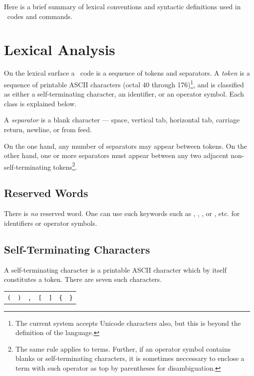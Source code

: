 \documentclass[a4paper]{memoir}
\begin{document}
Here is a brief summary of lexical conventions and syntactic definitions
used in \cafeobj~codes and commands.

\section{Lexical Analysis} \label{sec:lex}

On the lexical surface a \cafeobj~code is a sequence of tokens and
separators.
A {\em token} is a sequence of printable ASCII characters (octal
40 through 176)\footnote{The current system accepts Unicode 
characters also, but this is beyond the definition of
the language.}, and is classified as either a self-terminating
character, an identifier, or an operator symbol. Each class
is explained below.

A {\em separator} is a blank character --- space, vertical tab,
horizontal tab, carriage return, newline, or from feed.

On the one hand, any mumber of separators may appear between tokens. 
On the other hand, one or more separators must appear between any two
adjacent non-self-terminating tokens\footnote{The same rule
applies to terms.
Further, if an operator symbol contains blanks or
self-terminating characters, it is sometimes neccessary to enclose a
term with such operator as top by parentheses for disambiguation.}.

\subsection{Reserved Words} \label{sec:keywords}

There is {\em no} reserved word.
One can use such keywords such as , , ,
or , etc. for identifiers or operator symbols.

\subsection{Self-Terminating Characters} \label{sec:lex-selfterminating}

A self-terminating character is a printable ASCII character
which by itself constitutes a token. There are seven such characters.
\begin{center}
\begin{minipage}{0.5\textwidth}
\begin{snugshade}
\begin{tabular}{lllllll}
  \verb|(| & \verb|)| & \verb|,| & \verb|[| & \verb|]| & \verb|{| & \verb|}|
\end{tabular}
\end{snugshade}
\end{minipage}
\end{center}
\end{document}
